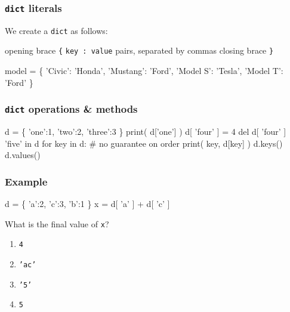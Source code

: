 \documentclass[11pt]{beamer}
\begin{document}
\begin{frame}[fragile]
  \frametitle{\texttt{dict} literals}
  \Enlarge

  \begin{itemize}
  \myitem  We create a \texttt{dict} as follows:
    \begin{itemize}
    \mysubitem  opening brace \texttt{\{}
    \mysubitem  \texttt{key : value} pairs, separated by commas
    \mysubitem  closing brace \texttt{\}}
    \end{itemize}
  \end{itemize}
  \begin{semiverbatim}
model = \{
  'Civic': 'Honda',
  'Mustang': 'Ford',
  'Model S': 'Tesla',
  'Model T': 'Ford'
\}
  \end{semiverbatim}
\end{frame}

\begin{frame}[fragile]
  \frametitle{\texttt{dict} operations \& methods}
  \Enlarge

  \begin{semiverbatim}
d = \{ 'one':1, 'two':2, 'three':3 \}
print( d['one'] )
d[ 'four' ] = 4
del d[ 'four' ]
'five' in d
for key in d:  # no guarantee on order
    print( key, d[key] )
d.keys()
d.values()
  \end{semiverbatim}
\end{frame}

\begin{frame}[fragile]
  \frametitle{Example}
  \Enlarge

  \begin{semiverbatim}
d = \{ 'a':2, 'c':3, 'b':1 \}
x = d[ 'a' ] + d[ 'c' ]
  \end{semiverbatim}
  What is the final value of \texttt{x}?
  \begin{enumerate}[label=\Alph*]
  \item  \texttt{4}
  \item  \texttt{'ac'}
  \item  \texttt{'5'}
  \item  \texttt{5}
  \end{enumerate}
\end{frame}
\end{document}
